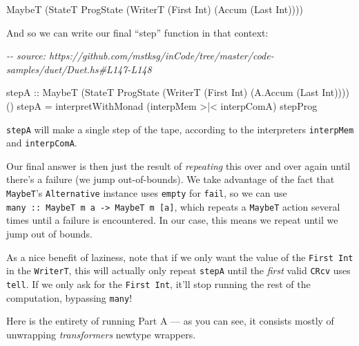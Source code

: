 \documentclass[]{article}
\newenvironment{Shaded}{}{}
\newcommand{\CommentTok}[1]{\textcolor[rgb]{0.38,0.63,0.69}{\textit{#1}}}
\newcommand{\DataTypeTok}[1]{\textcolor[rgb]{0.56,0.13,0.00}{#1}}
\newcommand{\NormalTok}[1]{#1}
\newcommand{\OperatorTok}[1]{\textcolor[rgb]{0.40,0.40,0.40}{#1}}
\newcommand{\OtherTok}[1]{\textcolor[rgb]{0.00,0.44,0.13}{#1}}
\begin{document}
\begin{Shaded}
\begin{Highlighting}[]
\DataTypeTok{MaybeT}\NormalTok{ (}\DataTypeTok{StateT} \DataTypeTok{ProgState}\NormalTok{ (}\DataTypeTok{WriterT}\NormalTok{ (}\DataTypeTok{First} \DataTypeTok{Int}\NormalTok{) (}\DataTypeTok{Accum}\NormalTok{ (}\DataTypeTok{Last} \DataTypeTok{Int}\NormalTok{))))}
\end{Highlighting}
\end{Shaded}

And so we can write our final ``step'' function in that context:

\begin{Shaded}
\begin{Highlighting}[]
\CommentTok{{-}{-} source: https://github.com/mstksg/inCode/tree/master/code{-}samples/duet/Duet.hs\#L147{-}L148}

\OtherTok{stepA ::} \DataTypeTok{MaybeT}\NormalTok{ (}\DataTypeTok{StateT} \DataTypeTok{ProgState}\NormalTok{ (}\DataTypeTok{WriterT}\NormalTok{ (}\DataTypeTok{First} \DataTypeTok{Int}\NormalTok{) (}\DataTypeTok{A.Accum}\NormalTok{ (}\DataTypeTok{Last} \DataTypeTok{Int}\NormalTok{)))) ()}
\NormalTok{stepA }\OtherTok{=}\NormalTok{ interpretWithMonad (interpMem }\OperatorTok{\textgreater{}|\textless{}}\NormalTok{ interpComA) stepProg}
\end{Highlighting}
\end{Shaded}

\texttt{stepA} will make a single step of the tape, according to the
interpreters \texttt{interpMem} and \texttt{interpComA}.

Our final answer is then just the result of \emph{repeating} this over and over
again until there's a failure (we jump out-of-bounds). We take advantage of the
fact that \texttt{MaybeT}'s \texttt{Alternative} instance uses \texttt{empty}
for \texttt{fail}, so we can use
\texttt{many\ ::\ MaybeT\ m\ a\ -\textgreater{}\ MaybeT\ m\ {[}a{]}}, which
repeats a \texttt{MaybeT} action several times until a failure is encountered.
In our case, this means we repeat until we jump out of bounds.

As a nice benefit of laziness, note that if we only want the value of the
\texttt{First\ Int} in the \texttt{WriterT}, this will actually only repeat
\texttt{stepA} until the \emph{first} valid \texttt{CRcv} uses \texttt{tell}. If
we only ask for the \texttt{First\ Int}, it'll stop running the rest of the
computation, bypassing \texttt{many}!

Here is the entirety of running Part A --- as you can see, it consists mostly of
unwrapping \emph{transformers} newtype wrappers.
\end{document}
